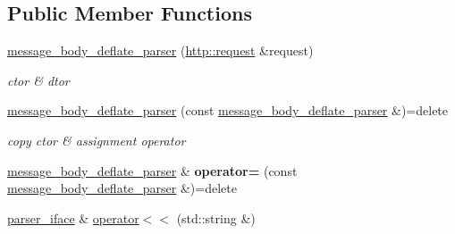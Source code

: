 \subsection*{Public Member Functions}
\begin{DoxyCompactItemize}
\item 
\mbox{\label{classnetflex_1_1parsing_1_1message__body__deflate__parser_a50f8b3c3bc5a6ad1b8bd63803d92c455}} 
\hyperlink{classnetflex_1_1parsing_1_1message__body__deflate__parser_a50f8b3c3bc5a6ad1b8bd63803d92c455}{message\+\_\+body\+\_\+deflate\+\_\+parser} (\hyperlink{classnetflex_1_1http_1_1request}{http\+::request} \&request)
\begin{DoxyCompactList}\small\item\em ctor \& dtor \end{DoxyCompactList}\item 
\mbox{\label{classnetflex_1_1parsing_1_1message__body__deflate__parser_a883c098ee9b13ef7c0986c1634794b0d}} 
\hyperlink{classnetflex_1_1parsing_1_1message__body__deflate__parser_a883c098ee9b13ef7c0986c1634794b0d}{message\+\_\+body\+\_\+deflate\+\_\+parser} (const \hyperlink{classnetflex_1_1parsing_1_1message__body__deflate__parser}{message\+\_\+body\+\_\+deflate\+\_\+parser} \&)=delete
\begin{DoxyCompactList}\small\item\em copy ctor \& assignment operator \end{DoxyCompactList}\item 
\mbox{\label{classnetflex_1_1parsing_1_1message__body__deflate__parser_a5d5b893c9f2e32b2ec09cf16ada13c36}} 
\hyperlink{classnetflex_1_1parsing_1_1message__body__deflate__parser}{message\+\_\+body\+\_\+deflate\+\_\+parser} \& {\bfseries operator=} (const \hyperlink{classnetflex_1_1parsing_1_1message__body__deflate__parser}{message\+\_\+body\+\_\+deflate\+\_\+parser} \&)=delete
\item 
\mbox{\label{classnetflex_1_1parsing_1_1message__body__deflate__parser_af7ee85cc5edee4e1f6cf34bebccceaa4}} 
\hyperlink{classnetflex_1_1parsing_1_1parser__iface}{parser\+\_\+iface} \& \hyperlink{classnetflex_1_1parsing_1_1message__body__deflate__parser_af7ee85cc5edee4e1f6cf34bebccceaa4}{operator$<$$<$} (std\+::string \&)

\end{DoxyCompactItemize}
